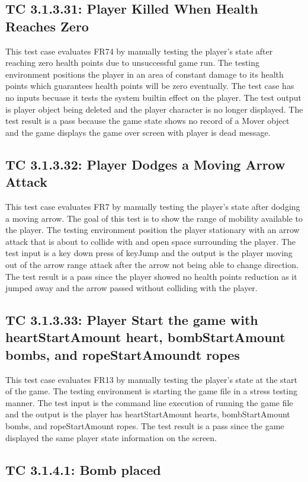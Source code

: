 \documentclass[12pt, titlepage]{article}
\begin{document}
\subsection*{TC 3.1.3.31: Player Killed When Health Reaches Zero}
This test case evaluates FR74 by manually testing the player's state after reaching zero health points due to unsuccessful game run. The testing environment positions the player in an area of constant damage to its health points which guarantees health points will be zero eventually. The test case has no inputs becuase it tests the system builtin effect on the player. The test output is player object being deleted and the player character is no longer displayed. The test result is a pass because the game state shows no record of a Mover object and the game displays the game over screen with player is dead message. 

\subsection*{TC 3.1.3.32: Player Dodges a Moving Arrow Attack}
This test case evaluates FR7 by manually testing the player's state after dodging a moving arrow. The goal of this test is to show the range of mobility available to the player. The testing environment position the player stationary with an arrow attack that is about to collide with and open space surrounding the player. The test input is a key down press of keyJump and the output is the player moving out of the arrow range attack after the arrow not being able to change direction. The test result is a pass since the player showed no health points reduction as it jumped away and the arrow passed without colliding with the player. 

\subsection*{TC 3.1.3.33: Player Start the game with heartStartAmount heart, bombStartAmount bombs, and ropeStartAmoundt ropes}
This test case evaluates FR13 by manually testing the player's state at the start of the game. The testing environment is starting the game file in a stress testing manner. The test input is the command line execution of running the game file and the output is the player has heartStartAmount hearts, bombStartAmount bombs, and ropeStartAmount ropes. The test result is a pass since the game displayed the same player state information on the screen.

\subsection*{TC 3.1.4.1: Bomb placed}
\end{document}
